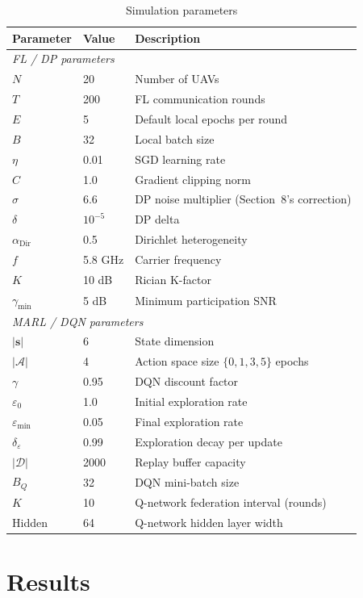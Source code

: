 \documentclass[12pt,a4paper]{article}
\begin{document}
\begin{table}[H]
\centering
\caption{Simulation parameters}
\begin{tabular}{lll}
\toprule
Parameter & Value & Description \\
\midrule
\multicolumn{3}{l}{\textit{FL / DP parameters}} \\
$N$ & 20 & Number of UAVs \\
$T$ & 200 & FL communication rounds \\
$E$ & 5 & Default local epochs per round \\
$B$ & 32 & Local batch size \\
$\eta$ & 0.01 & SGD learning rate \\
$C$ & 1.0 & Gradient clipping norm \\
$\sigma$ & 6.6 & DP noise multiplier (Section~8's correction) \\
$\delta$ & $10^{-5}$ & DP delta \\
$\alpha_{\mathrm{Dir}}$ & 0.5 & Dirichlet heterogeneity \\
$f$ & 5.8 GHz & Carrier frequency \\
$K$ & 10 dB & Rician K-factor \\
$\gamma_{\min}$ & 5 dB & Minimum participation SNR \\
\midrule
\multicolumn{3}{l}{\textit{MARL / DQN parameters}} \\
$|\mathbf{s}|$ & 6 & State dimension \\
$|\mathcal{A}|$ & 4 & Action space size $\{0,1,3,5\}$ epochs \\
$\gamma$ & 0.95 & DQN discount factor \\
$\varepsilon_0$ & 1.0 & Initial exploration rate \\
$\varepsilon_{\min}$ & 0.05 & Final exploration rate \\
$\delta_\varepsilon$ & 0.99 & Exploration decay per update \\
$|\mathcal{D}|$ & 2000 & Replay buffer capacity \\
$B_Q$ & 32 & DQN mini-batch size \\
$K$ & 10 & Q-network federation interval (rounds) \\
Hidden & 64 & Q-network hidden layer width \\
\bottomrule
\end{tabular}
\label{tab:params}
\end{table}

\section{Results}
\end{document}
